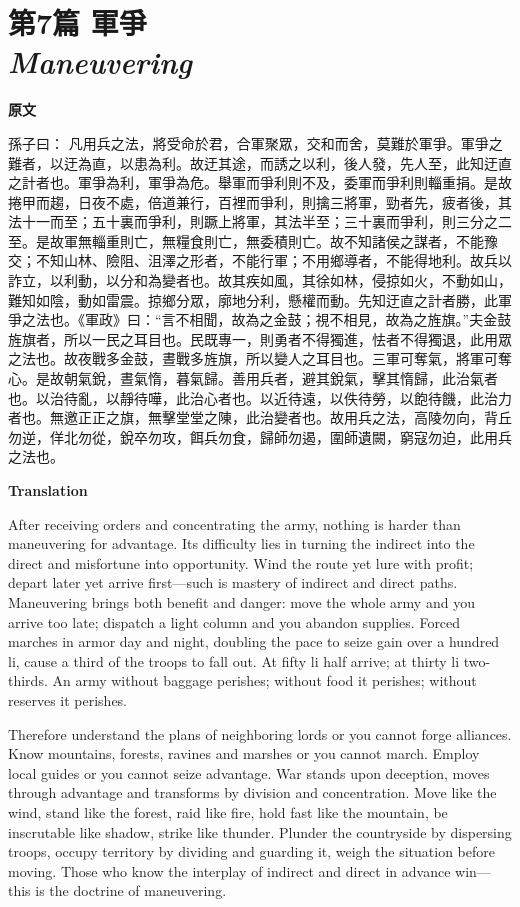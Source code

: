\documentclass[12pt]{book}
\newcommand{\chapterentry}[4]{%
  \chapter[\texorpdfstring{#1}{#1}]{\texorpdfstring{#1\\\Large\textit{#2}}{#1 — #2}}%
  \noindent\textbf{原文}\par
  #3

  \bigskip
  \noindent\textbf{Translation}\par
  #4
}
\begin{document}
\chapterentry{第7篇 軍爭}{Maneuvering}{%
孫子曰： 凡用兵之法，將受命於君，合軍聚眾，交和而舍，莫難於軍爭。軍爭之難者，以迂為直，以患為利。故迂其途，而誘之以利，後人發，先人至，此知迂直之計者也。軍爭為利，軍爭為危。舉軍而爭利則不及，委軍而爭利則輜重捐。是故捲甲而趨，日夜不處，倍道兼行，百裡而爭利，則擒三將軍，勁者先，疲者後，其法十一而至；五十裏而爭利，則蹶上將軍，其法半至；三十裏而爭利，則三分之二至。是故軍無輜重則亡，無糧食則亡，無委積則亡。故不知諸侯之謀者，不能豫交；不知山林、險阻、沮澤之形者，不能行軍；不用鄉導者，不能得地利。故兵以詐立，以利動，以分和為變者也。故其疾如風，其徐如林，侵掠如火，不動如山，難知如陰，動如雷震。掠鄉分眾，廓地分利，懸權而動。先知迂直之計者勝，此軍爭之法也。《軍政》曰：“言不相聞，故為之金鼓；視不相見，故為之旌旗。”夫金鼓旌旗者，所以一民之耳目也。民既專一，則勇者不得獨進，怯者不得獨退，此用眾之法也。故夜戰多金鼓，晝戰多旌旗，所以變人之耳目也。三軍可奪氣，將軍可奪心。是故朝氣銳，晝氣惰，暮氣歸。善用兵者，避其銳氣，擊其惰歸，此治氣者也。以治待亂，以靜待嘩，此治心者也。以近待遠，以佚待勞，以飽待饑，此治力者也。無邀正正之旗，無擊堂堂之陳，此治變者也。故用兵之法，高陵勿向，背丘勿逆，佯北勿從，銳卒勿攻，餌兵勿食，歸師勿遏，圍師遺闕，窮寇勿迫，此用兵之法也。}{%
After receiving orders and concentrating the army, nothing is harder than maneuvering for advantage. Its difficulty lies in turning the indirect into the direct and misfortune into opportunity. Wind the route yet lure with profit; depart later yet arrive first—such is mastery of indirect and direct paths. Maneuvering brings both benefit and danger: move the whole army and you arrive too late; dispatch a light column and you abandon supplies. Forced marches in armor day and night, doubling the pace to seize gain over a hundred li, cause a third of the troops to fall out. At fifty li half arrive; at thirty li two-thirds. An army without baggage perishes; without food it perishes; without reserves it perishes.

Therefore understand the plans of neighboring lords or you cannot forge alliances. Know mountains, forests, ravines and marshes or you cannot march. Employ local guides or you cannot seize advantage. War stands upon deception, moves through advantage and transforms by division and concentration. Move like the wind, stand like the forest, raid like fire, hold fast like the mountain, be inscrutable like shadow, strike like thunder. Plunder the countryside by dispersing troops, occupy territory by dividing and guarding it, weigh the situation before moving. Those who know the interplay of indirect and direct in advance win—this is the doctrine of maneuvering.

}
\end{document}

